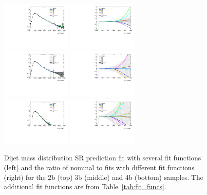 \begin{figure}[htbp!]
\begin{center}
\includegraphics[width=0.31\textwidth,angle=-90]{figures/boosted/Syst_Smooth/smoothFuncCompare_22_comp.pdf}
\includegraphics[width=0.31\textwidth,angle=-90]{figures/boosted/Syst_Smooth/smoothFuncCompare_22_comp_ratio.pdf} \\
\includegraphics[width=0.31\textwidth,angle=-90]{figures/boosted/Syst_Smooth/smoothFuncCompare_33_comp.pdf}
\includegraphics[width=0.31\textwidth,angle=-90]{figures/boosted/Syst_Smooth/smoothFuncCompare_33_comp_ratio.pdf} \\
\includegraphics[width=0.31\textwidth,angle=-90]{figures/boosted/Syst_Smooth/smoothFuncCompare_44_comp.pdf}
\includegraphics[width=0.31\textwidth,angle=-90]{figures/boosted/Syst_Smooth/smoothFuncCompare_44_comp_ratio.pdf} \\
\caption{ Dijet mass distribution SR prediction fit with several fit functions (left) and the ratio of nominal to fits with different fit functions (right)  for the 2b (top) 3b (middle) and 4b (bottom) samples. The additional fit functions are from Table~\ref{tab:fit_funcs}.}
\label{fig:qcd_fit_funcs_sys}
\end{center}
\end{figure}

